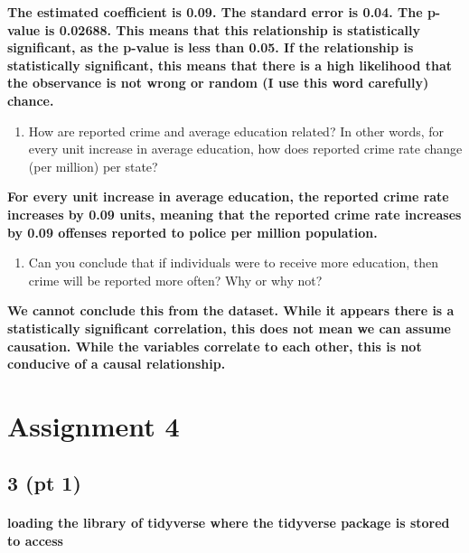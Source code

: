 \documentclass[
]{article}
\providecommand{\tightlist}{%
  \setlength{\itemsep}{0pt}\setlength{\parskip}{0pt}}
\begin{document}
\textbf{The estimated coefficient is 0.09. The standard error is 0.04.
The p-value is 0.02688. This means that this relationship is
statistically significant, as the p-value is less than 0.05. If the
relationship is statistically significant, this means that there is a
high likelihood that the observance is not wrong or random (I use this
word carefully) chance.}

\begin{enumerate}
\def\labelenumi{\arabic{enumi}.}
\setcounter{enumi}{5}
\tightlist
\item
  How are reported crime and average education related? In other words,
  for every unit increase in average education, how does reported crime
  rate change (per million) per state?
\end{enumerate}

\textbf{For every unit increase in average education, the reported crime
rate increases by 0.09 units, meaning that the reported crime rate
increases by 0.09 offenses reported to police per million population.}

\begin{enumerate}
\def\labelenumi{\arabic{enumi}.}
\setcounter{enumi}{6}
\tightlist
\item
  Can you conclude that if individuals were to receive more education,
  then crime will be reported more often? Why or why not?
\end{enumerate}

\textbf{We cannot conclude this from the dataset. While it appears there
is a statistically significant correlation, this does not mean we can
assume causation. While the variables correlate to each other, this is
not conducive of a causal relationship.}

\hypertarget{assignment-4}{%
\section{Assignment 4}\label{assignment-4}}

\hypertarget{pt-1}{%
\subsection{3 (pt 1)}\label{pt-1}}

\hypertarget{loading-the-library-of-tidyverse-where-the-tidyverse-package-is-stored-to-access}{%
\paragraph{loading the library of tidyverse where the tidyverse package
is stored to
access}\label{loading-the-library-of-tidyverse-where-the-tidyverse-package-is-stored-to-access}}
\end{document}
